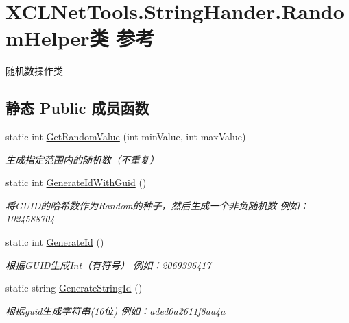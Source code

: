\hypertarget{class_x_c_l_net_tools_1_1_string_hander_1_1_random_helper}{\section{X\-C\-L\-Net\-Tools.\-String\-Hander.\-Random\-Helper类 参考}
\label{class_x_c_l_net_tools_1_1_string_hander_1_1_random_helper}
}


随机数操作类  


\subsection*{静态 Public 成员函数}
\begin{DoxyCompactItemize}
\item 
static int \hyperlink{class_x_c_l_net_tools_1_1_string_hander_1_1_random_helper_a6b5009f83de1931fe3fd19142aa53586}{Get\-Random\-Value} (int min\-Value, int max\-Value)
\begin{DoxyCompactList}\small\item\em 生成指定范围内的随机数（不重复） \end{DoxyCompactList}\item 
static int \hyperlink{class_x_c_l_net_tools_1_1_string_hander_1_1_random_helper_a73f5f5edf29e9226b6b00cd7ad471ea7}{Generate\-Id\-With\-Guid} ()
\begin{DoxyCompactList}\small\item\em 将\-G\-U\-I\-D的哈希数作为\-Random的种子，然后生成一个非负随机数 例如：1024588704 \end{DoxyCompactList}\item 
static int \hyperlink{class_x_c_l_net_tools_1_1_string_hander_1_1_random_helper_adfcadc291d76f970c4d422210794f8ac}{Generate\-Id} ()
\begin{DoxyCompactList}\small\item\em 根据\-G\-U\-I\-D生成\-Int（有符号） 例如：2069396417 \end{DoxyCompactList}\item 
static string \hyperlink{class_x_c_l_net_tools_1_1_string_hander_1_1_random_helper_a51813c8b3782151227ae2db0881fcd7c}{Generate\-String\-Id} ()
\begin{DoxyCompactList}\small\item\em 根据guid生成字符串(16位) 例如：aded0a2611f8aa4a \end{DoxyCompactList}\item 

\end{DoxyCompactItemize}
